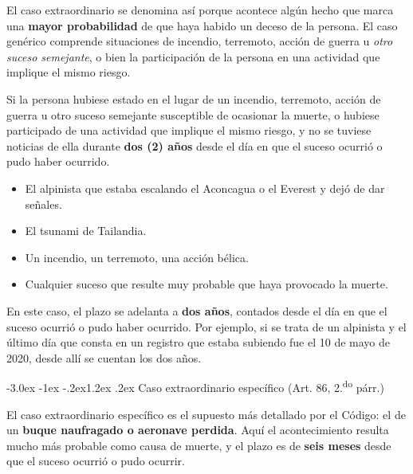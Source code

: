 \documentclass[12pt,oneside]{book}
\makeatletter
\renewcommand\section{\@startsection{section}{1}{\z@}%
  {-3.0ex \@plus -1ex \@minus -.2ex}{1.2ex \@plus .2ex}%
  {\normalfont\large\bfseries\color{acento}}}
\makeatother
\begin{document}
El caso extraordinario se denomina así porque acontece algún hecho que
marca una \textbf{mayor probabilidad} de que haya habido un deceso de la
persona. El caso genérico comprende situaciones de incendio, terremoto,
acción de guerra u \textit{otro suceso semejante}, o bien la
participación de la persona en una actividad que implique el mismo
riesgo.

\begin{regla}
Si la persona hubiese estado en el lugar de un incendio, terremoto,
acción de guerra u otro suceso semejante susceptible de ocasionar la
muerte, o hubiese participado de una actividad que implique el mismo
riesgo, y no se tuviese noticias de ella durante \textbf{dos (2) años}
desde el día en que el suceso ocurrió o pudo haber ocurrido.
\end{regla}

\begin{ejemplo}
\begin{itemize}
    \item El alpinista que estaba escalando el Aconcagua o el Everest y dejó de dar señales.
    \item El tsunami de Tailandia.
    \item Un incendio, un terremoto, una acción bélica.
    \item Cualquier suceso que resulte muy probable que haya provocado la muerte.
\end{itemize}
\end{ejemplo}

En este caso, el plazo se adelanta a \textbf{dos años}, contados desde el
día en que el suceso ocurrió o pudo haber ocurrido. Por ejemplo, si se
trata de un alpinista y el último día que consta en un registro que
estaba subiendo fue el 10 de mayo de 2020, desde allí se cuentan los dos
años.

\section{Caso extraordinario específico (Art. 86, 2.\textsuperscript{do} párr.)}

El caso extraordinario específico es el supuesto más detallado por el
Código: el de un \textbf{buque naufragado o aeronave perdida}. Aquí el
acontecimiento resulta mucho más probable como causa de muerte, y el
plazo es de \textbf{seis meses} desde que el suceso ocurrió o pudo
ocurrir.
\end{document}
